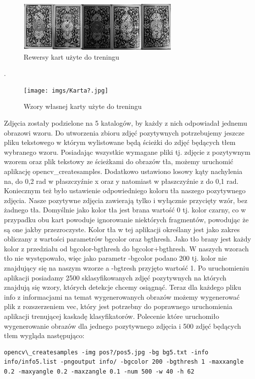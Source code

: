\begin{figure}[H]
	\centering
	\includegraphics[scale=1.0]{imgs/RewersyKarty.jpg}
	\caption{Rewersy kart użyte do treningu}
	\label{fig:KartaRewers}
\end{figure}
.

\begin{figure}[H]
	\centering
	\texttt{[image: imgs/Karta?.jpg]}
	\caption{Wzory własnej karty użyte do treningu}
	\label{fig:KartaTajemnicza}
\end{figure}

Zdjęcia zostały podzielone na 5 katalogów, by każdy z nich odpowiadał jednemu obrazowi wzoru. Do utworzenia zbioru zdjęć pozytywnych potrzebujemy jeszcze pliku tekstowego w którym wylistowane będą ścieżki do zdjęć będących tłem wybranego wzoru. Posiadając wszystkie wymagane pliki tj. zdjęcie z pozytywnym wzorem oraz plik tekstowy ze ścieżkami do obrazów tła, możemy uruchomić aplikację opencv\_createsamples. Dodatkowo ustawiono losowy kąty nachylenia na, do 0,2 rad w płaszczyźnie x oraz y natomiast w płaszczyźnie z do 0,1 rad. Koniecznym też było ustawienie odpowiedniego koloru tła naszego pozytywnego zdjęcia. Nasze pozytywne zdjęcia zawierają tylko i wyłącznie przycięty wzór, bez żadnego tła. Domyślnie jako kolor tła jest brana wartość 0 tj. kolor czarny, co w przypadku obu kart powoduje ignorowanie niektórych fragmentów, powodując że są one jakby przezroczyste. Kolor tła w tej aplikacji określany jest jako zakres obliczany z wartości parametrów bgcolor oraz bgthresh. Jako tło brany jest każdy kolor z przedziału od bgcolor-bgthresh do bgcolor+bgthresh. W naszych wzorach tło nie występowało, więc jako parametr -bgcolor podano 200 tj. kolor nie znajdujący się na naszym wzorze a -bgtresh przyjęto wartość 1. Po uruchomieniu aplikacji posiadamy 2500 sklasyfikowanych zdjęć pozytywnych na których znajdują się wzory, których detekcje chcemy osiągnąć. Teraz dla każdego pliku info z informacjami na temat wygenerowanych obrazów możemy wygenerować plik z rozszerzeniem vec, który jest potrzebny do poprawnego uruchomienia aplikacji trenującej kaskadę klasyfikatorów.
Polecenie które uruchomiło wygenerowanie obrazów dla jednego pozytywnego zdjęcia i 500 zdjęć będących tłem wygląda następująco:
\begin{lstlisting}
opencv\_createsamples -img pos?/pos5.jpg -bg bg5.txt -info info/info5.list -pngoutput info/ -bgcolor 200 -bgthresh 1 -maxxangle 0.2 -maxyangle 0.2 -maxzangle 0.1 -num 500 -w 40 -h 62
\end{lstlisting}


